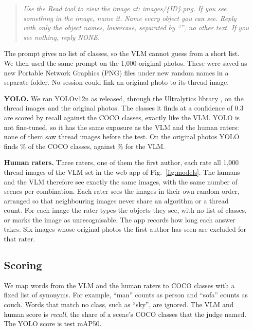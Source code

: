 \documentclass[conference]{IEEEtran}
\begin{document}
\begin{quote}\small\itshape
Use the Read tool to view the image at: images/\{ID\}.png. If you see something in the image, name it. Name every object you can see. Reply with only the object names, lowercase, separated by ``\textbar'', no other text. If you see nothing, reply NONE.
\end{quote}

The prompt gives no list of classes, so the VLM cannot guess from a short list. We then used the same prompt on the 1,000 original photos. These were saved as new Portable Network Graphics (PNG) files under new random names in a separate folder. No session could link an original photo to its thread image.

\textbf{YOLO.} We ran YOLOv12n \cite{tian2025} as released, through the Ultralytics library \cite{ultralytics}, on the thread images and the original photos. The classes it finds at a confidence of 0.3 are scored by recall against the COCO classes, exactly like the VLM. YOLO is not fine-tuned, so it has the same exposure as the VLM and the human raters: none of them saw thread images before the test. On the original photos YOLO finds \YoloRecallOriginal\% of the COCO classes, against \VlmRecallOriginal\% for the VLM.

\textbf{Human raters.} Three raters, one of them the first author, each rate all 1,000 thread images of the VLM set in the web app of Fig.~\ref{fig:models}. The humans and the VLM therefore see exactly the same images, with the same number of scenes per combination. Each rater sees the images in their own random order, arranged so that neighbouring images never share an algorithm or a thread count. For each image the rater types the objects they see, with no list of classes, or marks the image as unrecognisable. The app records how long each answer takes. Six images whose original photos the first author has seen are excluded for that rater.

\subsection{Scoring}

We map words from the VLM and the human raters to COCO classes with a fixed list of synonyms. For example, ``man'' counts as person and ``sofa'' counts as couch. Words that match no class, such as ``sky'', are ignored. The VLM and human score is \emph{recall}, the share of a scene's COCO classes that the judge named. The YOLO score is test mAP50.
\end{document}
